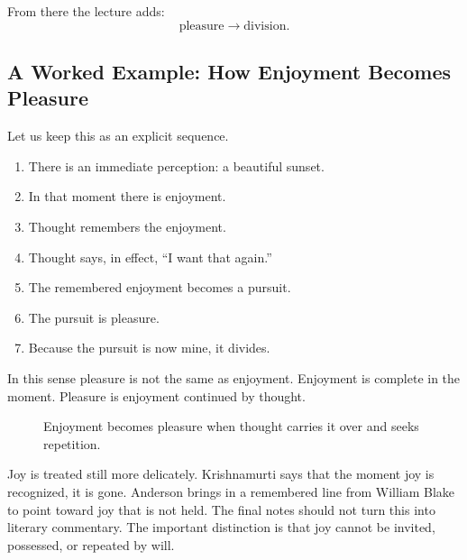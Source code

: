 From there the lecture adds:
\begin{equation}
\text{pleasure} \longrightarrow \text{division}.
\end{equation}

\subsection{A Worked Example: How Enjoyment Becomes Pleasure}

Let us keep this as an explicit sequence.

\begin{enumerate}
\item There is an immediate perception: a beautiful sunset.
\item In that moment there is enjoyment.
\item Thought remembers the enjoyment.
\item Thought says, in effect, ``I want that again.''
\item The remembered enjoyment becomes a pursuit.
\item The pursuit is pleasure.
\item Because the pursuit is now mine, it divides.
\end{enumerate}

In this sense pleasure is not the same as enjoyment. Enjoyment is complete in the moment. Pleasure is enjoyment continued by thought.

\begin{figure}
\centering
{}
\caption{Enjoyment becomes pleasure when thought carries it over and seeks repetition.}
\end{figure}

Joy is treated still more delicately. Krishnamurti says that the moment joy is recognized, it is gone. Anderson brings in a remembered line from William Blake to point toward joy that is not held. The final notes should not turn this into literary commentary. The important distinction is that joy cannot be invited, possessed, or repeated by will.

